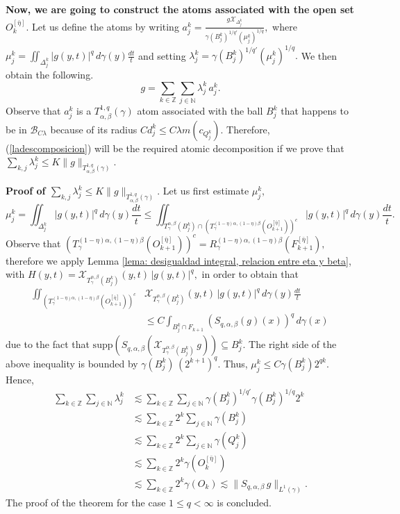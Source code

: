 \documentclass[leqno,11pt]{amsart}
\theoremstyle{plain}
\theoremstyle{remark}
\begin{document}
{{{{\bf  Now, we are going to construct the atoms associated with the open set $O_k^{[\bar{\eta}]}.$} Let us define the atoms by writing $a_j^k= \frac{g \mathcal{X}_{\Delta_j^k}}{\gamma(B_j^k)^{1/q'}(\mu_j^k)^{1/q}},$ where $\mu_j^k=\iint_{\Delta_j^k}|g(y,t)|^q\, d\gamma(y)\frac{dt}{t}$ and setting $\lambda_j^k=\gamma(B_j^k)^{1/q'}(\mu_j^k)^{1/q}.$ We then obtain the following. \begin{equation}\label{ladescomposicion}g=\sum_{k\in {\mathbb Z}}\sum_{j\in {\mathbb N}}\lambda_j^k\, a_j^k.\end{equation} Observe that $a_j^k$ is a $T^{1,q}_{\alpha, \beta}(\gamma)$ atom associated with the ball $B_j^k$ that happens to be in $\mathscr{B}_{C\lambda}$ because of its radius $C d_j^k\le C \lambda m(c_{Q_j^k}).$ Therefore, (\ref{ladescomposicion}) will be the required atomic decomposition if we prove that $\sum_{k,j}\lambda_j^k\le K \|g\|_{T^{1,q}_{\alpha, \beta}(\gamma)}.$


 {\bf Proof of $\sum_{k,j}\lambda_j^k\le K \|g\|_{T^{1,q}_{\alpha, \beta}(\gamma)}.$}
Let us first estimate $\mu_j^k,$ $$\mu_j^k=\iint_{\Delta_j^k}|g(y,t)|^q\, d\gamma(y)\frac{dt}{t}\le \iint_{T_\gamma^{\alpha, \beta}(B_j^k)\cap (T_\gamma^{(1-\eta)\alpha, (1-\eta)\beta}(O_{k+1}^{[\bar{\eta}]}))^c}|g(y,t)|^q\, d\gamma(y)\frac{dt}{t}.$$ 
Observe that $(T_\gamma^{(1-\eta)\alpha, (1-\eta)\beta}(O_{k+1}^{[\bar{\eta}]}))^c=R_\gamma^{(1-\eta)\alpha, (1-\eta)\beta}(F_{k+1}^{[\bar{\eta}]}),$  
therefore we apply Lemma \ref{lema: desigualdad integral, relacion entre eta y beta}, with $H(y,t)=\mathcal{X}_{T_\gamma^{\alpha,\beta}(B_j^k)}(y,t)\, |g(y,t)|^q,$ in order to obtain that 
\begin{align*}\iint_{(T_\gamma^{(1-\eta)\alpha, (1-\eta)\beta}(O_{k+1}^{[\bar{\eta}]}))^c} &\mathcal{X}_{T^{\alpha,\beta}_\gamma (B_j^k)}(y,t)\, |g(y,t)|^q\, d\gamma(y)\frac{dt}{t}\\
&\le C \int_{B_j^k\cap F_{k+1}}(S_{q,\alpha, \beta}(g)(x))^q\, d\gamma(x) 
\end{align*}
due to the fact that $\text{supp}(S_{q,\alpha,\beta}(\mathcal{X}_{T^{\alpha, \beta}_\gamma(B_j^k)}\, g))\subseteq B_j^k$. The right side of the above inequality is bounded by $\gamma(B_j^k)\, (2^{k+1})^q.$  
Thus, $\mu_j^k\le C \gamma(B_j^k) 2^{q k}.$ Hence,
\begin{align*}
\sum_{k\in {\mathbb Z}}\sum_{j\in {\mathbb N}}\lambda_j^k & \lesssim \sum_{k\in {\mathbb Z}}\sum_{j\in {\mathbb N}}\gamma(B_j^k)^{1/q'} \gamma(B_j^k)^{1/q} 2^k\\
&\lesssim \sum_{k\in {\mathbb Z}} 2^k \sum_{j\in {\mathbb N}} \gamma(B_j^k)\\ &\lesssim \sum_{k\in {\mathbb Z}}2^k \sum_{j\in {\mathbb N}}\gamma (Q_j^k)\\ & \lesssim\sum_{k\in {\mathbb Z}}2^k \gamma (O_k^{[\bar{\eta}]})\\ &\lesssim \sum_{k\in {\mathbb Z}} 2^k \gamma(O_k)\lesssim \|S_{q,\alpha, \beta} \, g\|_{L^1(\gamma)}. 
\end{align*}
The proof of the theorem for the case $1\le q<\infty$ is concluded.
 

}}}
\end{document}
